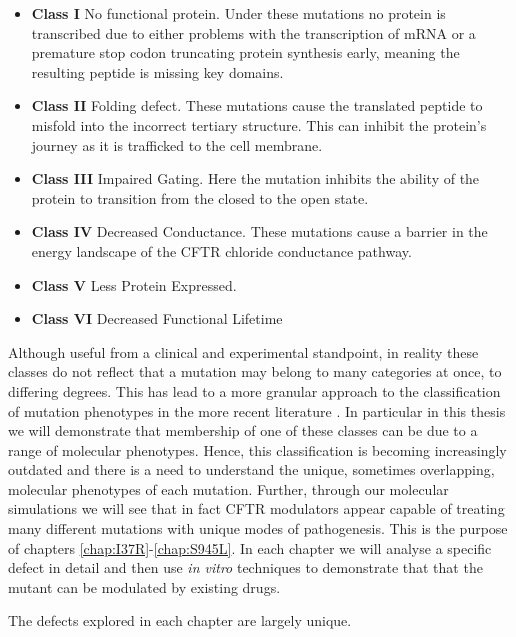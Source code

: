 \begin{itemize}
	\item \textbf{Class I} No functional protein. Under these mutations no protein is transcribed due to either problems with the transcription of mRNA or a premature stop codon truncating protein synthesis early, meaning the resulting peptide is missing key domains. 
	\item \textbf{Class II} Folding defect. These mutations cause the translated peptide to misfold into the incorrect tertiary structure. This can inhibit the protein's journey as it is trafficked to the cell membrane. 
	\item \textbf{Class III} Impaired Gating. Here the mutation inhibits the ability of the protein to transition from the closed to the open state. 
	\item \textbf{Class IV} Decreased Conductance. These mutations cause a barrier in the energy landscape of the CFTR chloride conductance pathway.
	\item \textbf{Class V} Less Protein Expressed.  
	\item \textbf{Class VI} Decreased Functional Lifetime

\end{itemize}

Although useful from a clinical and experimental standpoint, in reality these classes do not reflect that a mutation may belong to many categories at once, to differing degrees. This has lead to a more granular approach to the classification of mutation phenotypes in the more recent literature \cite{veit2016}. In particular in this thesis we will demonstrate that membership of one of these classes can be due to a range of molecular phenotypes. Hence, this classification is becoming increasingly outdated and there is a need to understand the unique, sometimes overlapping, molecular phenotypes of each mutation. Further, through our molecular simulations we will see that in fact CFTR modulators appear capable of treating many different mutations with unique modes of pathogenesis. This is the purpose of chapters \ref{chap:I37R}-\ref{chap:S945L}. In each chapter we will analyse a specific defect in detail and then use \textit {in vitro} techniques to demonstrate that that the mutant can be modulated by existing drugs. 

The defects explored in each chapter are largely unique. 

